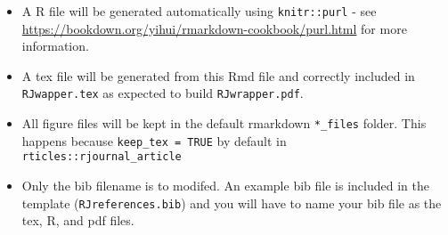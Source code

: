 \begin{itemize}
\tightlist
\item
  A R file will be generated automatically using \texttt{knitr::purl} -
  see \url{https://bookdown.org/yihui/rmarkdown-cookbook/purl.html} for
  more information.
\item
  A tex file will be generated from this Rmd file and correctly included
  in \texttt{RJwapper.tex} as expected to build \texttt{RJwrapper.pdf}.
\item
  All figure files will be kept in the default rmarkdown
  \texttt{*\_files} folder. This happens because
  \texttt{keep\_tex\ =\ TRUE} by default in
  \texttt{rticles::rjournal\_article}
\item
  Only the bib filename is to modifed. An example bib file is included
  in the template (\texttt{RJreferences.bib}) and you will have to name
  your bib file as the tex, R, and pdf files.
\end{itemize}



\address{%
Paavo Jumppanen\\
CSIRO Marine and Atmospheric Research\\%
Castray Esplanade,\\Battery Point TAS 7004,\\Australia\\
%
\url{https://www.csiro.au}%
\\\href{mailto:paavo.jumppanen@csiro.au}{\nolinkurl{paavo.jumppanen@csiro.au}}
}
